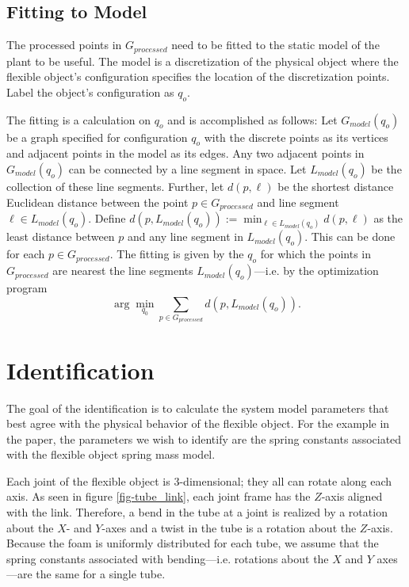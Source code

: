 \documentclass[runningheads,a4paper]{llncs}
\begin{document}
\subsection{Fitting to Model \label{sec-fit}}

The processed points in $G_{processed}$ need to be fitted to the static model of the plant to be useful. The model is a discretization of the physical object where the flexible object's configuration specifies the location of the discretization points. Label the object’s configuration as $q_o$. 

The fitting is a calculation on $q_o$ and is accomplished as follows: Let $G_{model}(q_o)$ be a graph specified for configuration $q_o$ with the discrete points as its vertices and adjacent points in the model as its edges. Any two adjacent points in $G_{model}(q_o)$ can be connected by a line segment in space. Let $L_{model}(q_o)$ be the collection of these line segments. Further, let $d(p,\ell)$ be the shortest distance Euclidean distance between the point $p\in G_{processed}$ and line segment $\ell \in L_{model}(q_o)$. Define $d(p,L_{model}(q_o)) := \min_{\ell\in L_{model}(q_o)} d(p,\ell)$ as the least distance between $p$ and any line segment in $L_{model}(q_o)$. This can be done for each $p\in G_{processed}$. The fitting is given by the $q_o$ for which the points in $G_{processed}$ are nearest the line segments $L_{model}(q_o)$---i.e. by the optimization program
\begin{equation}
\arg \min_{q_0} \sum_{p\in G_{processed}} d(p,L_{model}(q_o)).
\label{eq-fit_prog}
\end{equation}

\section{Identification}
\label{sec-id}
The goal of the identification is to calculate the system model parameters that best agree with the physical behavior of the flexible object. For the example in the paper, the parameters we wish to identify are the spring constants associated with the flexible object spring mass model. 

Each joint of the flexible object is 3-dimensional; they all can rotate along each axis. As seen in figure \ref{fig-tube_link}, each joint frame has the $Z$-axis aligned with the link. Therefore, a bend in the tube at a joint is realized by a rotation about the $X$- and $Y$-axes and a twist in the tube is a rotation about the $Z$-axis. Because the foam is uniformly distributed for each tube, we assume that the spring constants associated with bending---i.e. rotations about the $X$ and $Y$ axes---are the same for a single tube. 
\end{document}
